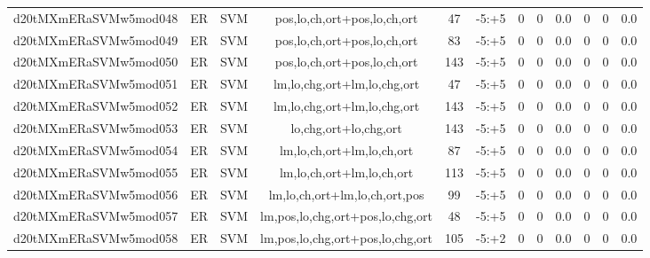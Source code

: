 \documentclass[a4paper]{article}
\begin{document}
\begin{landscape}
\begin{center}
\begin{tabular}{ |c|c|c|c|c|c|c|c|c|c|c|c|}
 
 	
 	\small{ d20tMXmERaSVMw5mod048 } & ER & SVM & pos,lo,ch,ort+pos,lo,ch,ort  &  47 &  -5:+5  &  0 & 0 & 0.0  &  0 & 0 & 0.0 \\
 	

 
 	
 	\small{ d20tMXmERaSVMw5mod049 } & ER & SVM & pos,lo,ch,ort+pos,lo,ch,ort  &  83 &  -5:+5  &  0 & 0 & 0.0  &  0 & 0 & 0.0 \\
 	

 
 	
 	\small{ d20tMXmERaSVMw5mod050 } & ER & SVM & pos,lo,ch,ort+pos,lo,ch,ort  &  143 &  -5:+5  &  0 & 0 & 0.0  &  0 & 0 & 0.0 \\
 	

 
 	
 	\small{ d20tMXmERaSVMw5mod051 } & ER & SVM & lm,lo,chg,ort+lm,lo,chg,ort  &  47 &  -5:+5  &  0 & 0 & 0.0  &  0 & 0 & 0.0 \\
 	

 
 	
 	\small{ d20tMXmERaSVMw5mod052 } & ER & SVM & lm,lo,chg,ort+lm,lo,chg,ort  &  143 &  -5:+5  &  0 & 0 & 0.0  &  0 & 0 & 0.0 \\
 	

 
 	
 	\small{ d20tMXmERaSVMw5mod053 } & ER & SVM & lo,chg,ort+lo,chg,ort  &  143 &  -5:+5  &  0 & 0 & 0.0  &  0 & 0 & 0.0 \\
 	

 
 	
 	\small{ d20tMXmERaSVMw5mod054 } & ER & SVM & lm,lo,ch,ort+lm,lo,ch,ort  &  87 &  -5:+5  &  0 & 0 & 0.0  &  0 & 0 & 0.0 \\
 	

 
 	
 	\small{ d20tMXmERaSVMw5mod055 } & ER & SVM & lm,lo,ch,ort+lm,lo,ch,ort  &  113 &  -5:+5  &  0 & 0 & 0.0  &  0 & 0 & 0.0 \\
 	

 
 	
 	\small{ d20tMXmERaSVMw5mod056 } & ER & SVM & lm,lo,ch,ort+lm,lo,ch,ort,pos  &  99 &  -5:+5  &  0 & 0 & 0.0  &  0 & 0 & 0.0 \\
 	

 
 	
 	\small{ d20tMXmERaSVMw5mod057 } & ER & SVM & lm,pos,lo,chg,ort+pos,lo,chg,ort  &  48 &  -5:+5  &  0 & 0 & 0.0  &  0 & 0 & 0.0 \\
 	

 
 	
 	\small{ d20tMXmERaSVMw5mod058 } & ER & SVM & lm,pos,lo,chg,ort+pos,lo,chg,ort  &  105 &  -5:+2  &  0 & 0 & 0.0  &  0 & 0 & 0.0 \\
 	


\end{tabular}
\end{center}
\end{landscape}
\end{document}
